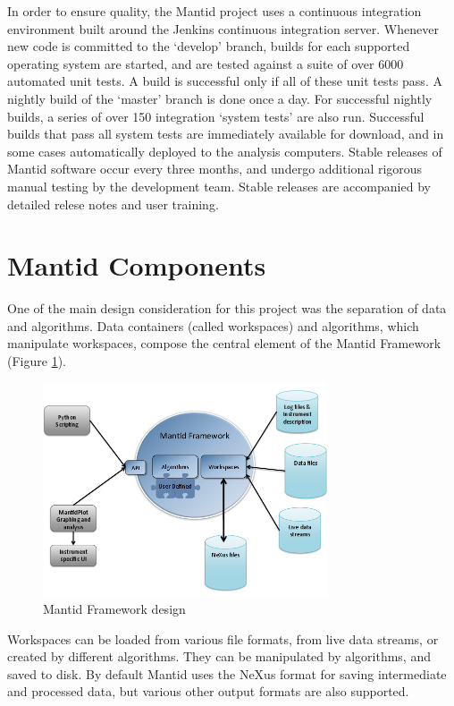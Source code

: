 \documentclass{elsarticle}
\begin{document}
In order to ensure quality, the Mantid project uses a continuous integration environment built around the Jenkins continuous integration server\cite{jenkins}. Whenever new code is committed to the `develop' branch, builds for each supported operating system are started, and are tested against a suite of over 6000 automated unit tests. A build is successful only if all of these unit tests pass. A nightly build of the `master' branch is done once a day. For successful nightly builds, a series of over 150 integration `system tests' are also run. Successful builds that pass all system tests are immediately available for download, and in some cases automatically deployed to the analysis computers. Stable releases of Mantid software occur every three months, and undergo additional rigorous manual testing by the development team. Stable releases are accompanied by detailed relese notes and user training. 



\section{Mantid Components}
One of the main design consideration for this project was the separation of data and algorithms. Data containers (called workspaces) and algorithms, which manipulate workspaces, compose the central element of the Mantid Framework (Figure \ref{fig:Framework}). 
\begin{figure}[!ht]
\centerline{\includegraphics[width=0.75\textwidth]{MantidFramework.png}}
\caption{Mantid Framework design}
\label{fig:Framework}
\end{figure}
Workspaces can be loaded from various file formats, from live data streams, or created by different algorithms. They can be manipulated by algorithms, and saved to disk. By default Mantid uses the NeXus format for saving intermediate and processed data, but various other output formats are also supported.
\end{document}
